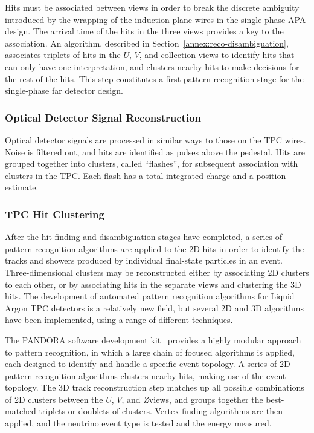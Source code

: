 Hits must be associated between views in order to break the discrete ambiguity
introduced by the wrapping of the induction-plane wires in the single-phase APA design.
The arrival time of the hits in the three views provides a key to the association.
An algorithm, described in Section~\ref{annex:reco-disambiguation}, associates
triplets of hits in the $U$, $V$, and collection views to identify hits that
can only have one interpretation, and clusters nearby hits to make decisions for
the rest of the hits.  This step constitutes a first pattern recognition stage for
the single-phase far detector design.

\subsubsection{Optical Detector Signal Reconstruction}

Optical detector signals are processed in similar ways to those on the TPC wires.
Noise is filtered out, and hits are identified as pulses above the pedestal.
Hits are grouped together into clusters, called ``flashes'', for subsequent
association with clusters in the TPC.  Each flash has a total integrated charge and a position
estimate.

\subsubsection{TPC Hit Clustering}

After the hit-finding and disambiguation stages have completed, a series of 
pattern recognition algorithms are applied to the 2D hits in order to identify 
the tracks and showers produced by individual final-state particles in an event.
Three-dimensional clusters may be reconstructed either by associating 2D clusters
to each other, or by associating hits in the separate views and clustering the 3D hits.
The development of automated pattern recognition algorithms for Liquid Argon 
TPC detectors is a relatively new field, but several 2D and 3D algorithms
have been implemented, using a range of different techniques.

The PANDORA software development kit~\cite{Marshall:2013bda,Marshall:2012hh} provides
a highly modular approach to pattern recognition, in which a large chain of focused
algorithms is applied, each designed to identify and handle
a specific event topology.  A series of 2D pattern recognition algorithms clusters
nearby hits, making use of the event topology.  The 3D track reconstruction step
matches up all possible combinations 
of 2D clusters between the $U$, $V$, and $Z$views, and groups together 
the best-matched triplets or doublets of clusters.   Vertex-finding algorithms
are then applied, and the neutrino event type is tested and the energy measured.

